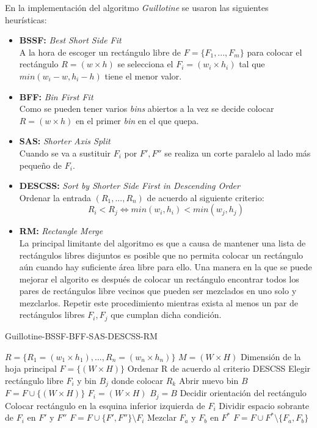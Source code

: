 \documentclass[a4paper,10pt,twocolumn]{article}
\begin{document}
En la implementación del algoritmo \textit{Guillotine} se usaron las siguientes heurísticas:
\begin{itemize}
	\item \textbf{BSSF:} \textit{Best Short Side Fit}\\
	A la hora de escoger un rectángulo libre de $F = \{F_1,...,F_m\}$ para colocar el rectángulo $R = (w \times h)$ se selecciona el $F_i = (w_i \times h_i)$ tal que $min(w_i-w,h_i-h)$ tiene el menor valor. 
	\item \textbf{BFF:} \textit{Bin First Fit}\\
	Como se pueden tener varios \textit{bins} abiertos a la vez se decide colocar $R = (w \times h)$ en el primer \textit{bin} en el que quepa.
	\item \textbf{SAS:} \textit{Shorter Axis Split}\\
	Cuando se va a sustituir $F_i$ por $F',F''$ se realiza un corte paralelo al lado más pequeño de $F_i$.
	\item \textbf{DESCSS:} \textit{Sort by Shorter Side First in Descending Order}\\
	Ordenar la entrada $(R_1,...,R_n)$ de acuerdo al siguiente criterio:
	$$R_i < R_j \Longleftrightarrow min(w_i,h_i) < min (w_j,h_j)$$ 
	\item \textbf{RM:} \textit{Rectangle Merge}\\
	La principal limitante del algoritmo es que a causa de mantener una lista de rectángulos libres disjuntos es posible que no permita colocar un rectángulo aún cuando hay suficiente área libre para ello. Una manera en la que se puede mejorar el algorito es después de colocar un rectángulo encontrar todos los pares de rectángulos libre vecinos que pueden ser mezclados en uno solo y mezclarlos. Repetir este procedimiento mientras exista al menos un par de rectángulos libres $F_i, F_j$ que cumplan dicha condición.
\end{itemize}

\algrenewcommand{}
\algrenewcommand{}
\begin{algorithm}
\caption{Guillotine-BSSF-BFF-SAS-DESCSS-RM}\label{guillotine}
\begin{algorithmic}[1]
	\Require $R = \{ R_1 = (w_1 \times h_1), ..., R_n = (w_n \times h_n) \}$ $ M = (W \times H)$ \Comment Dimensión de la hoja principal
	\State $F = \{(W \times H)\}$
	\State Ordenar R de acuerdo al criterio DESCSS
		\State Elegir rectángulo libre $F_i$ y bin $B_j$ donde colocar $R_k$
			\State Abrir nuevo bin $B$
			\State $F = F \cup \{(W \times H)\}$
			\State $F_i = (W \times H)$
			\State $B_j = B$ 
		\EndIf
		\State Decidir orientación del rectángulo
		\State Colocar rectángulo en la esquina inferior izquierda de $F_i$
		\State Dividir espacio sobrante de $F_i$ en $F'$ y $F''$
		\State $F = F \cup \{F', F''\} \setminus F_i $
			\State Mezclar $F_a$ y $F_b$ en $F^*$
			\State $F = F \cup F^* \setminus \{F_a, F_b\}  $
		\EndWhile
	\EndFor
\end{algorithmic}
\end{algorithm}
\end{document}
